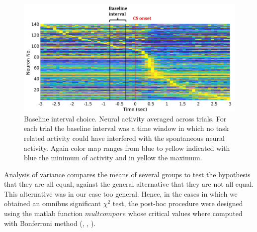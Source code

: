 \begin{figure}
    \centering
    \includegraphics[scale=0.6]{figures/Baseline.pdf}
    \caption{Baseline interval choice. Neural activity averaged across trials. For each trial the baseline interval was a time window in which no task related activity could have interfered with the spontaneous neural activity. Again color map ranges from blue to yellow indicated with blue the minimum of activity and in yellow the maximum.}
    \label{fig:Baseline}
\end{figure}
Analysis of variance compares the means of several groups to test the hypothesis that they are all equal, against the general alternative that they are not all equal. This alternative was in our case too general. Hence, in the cases in which we obtained an omnibus significant $\chi^2$ test, the post-hoc procedure were designed using the matlab function $\textit{multcompare}$ whose critical values where computed with Bonferroni method (\cite{Bonferroni}, \cite{Dunn1958}, \cite{Dunn1961}).\\
